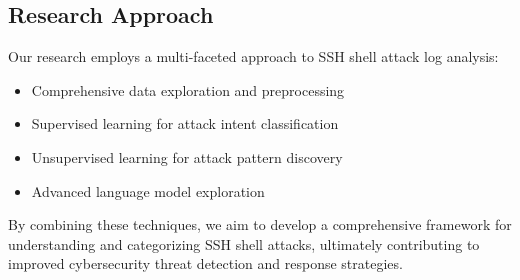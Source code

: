     \subsection{Research Approach}
    
    Our research employs a multi-faceted approach to SSH shell attack log analysis:

    \begin{itemize}
        \item Comprehensive data exploration and preprocessing
        \item Supervised learning for attack intent classification
        \item Unsupervised learning for attack pattern discovery
        \item Advanced language model exploration
    \end{itemize}

    By combining these techniques, we aim to develop a comprehensive framework for understanding and categorizing SSH shell attacks, ultimately contributing to improved cybersecurity threat detection and response strategies.
